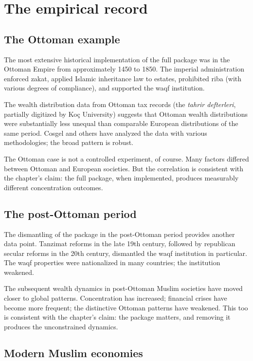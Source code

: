 \section{The empirical record}
\label{sec:perm-empirical}

\subsection{The Ottoman example}

The most extensive historical implementation of the full package
was in the Ottoman Empire from approximately 1450 to 1850. The
imperial administration enforced zakat, applied Islamic
inheritance law to estates, prohibited riba (with various degrees
of compliance), and supported the waqf institution.

The wealth distribution data from Ottoman tax records (the
\textit{tahrir defterleri}, partially digitized by Ko\c{c}
University) suggests that Ottoman wealth distributions were
substantially less unequal than comparable European
distributions of the same period. Cosgel and others have analyzed
the data with various methodologies; the broad pattern is robust.

The Ottoman case is not a controlled experiment, of course. Many
factors differed between Ottoman and European societies. But the
correlation is consistent with the chapter's claim: the full
package, when implemented, produces measurably different
concentration outcomes.

\subsection{The post-Ottoman period}

The dismantling of the package in the post-Ottoman period
provides another data point. Tanzimat reforms in the late 19th
century, followed by republican secular reforms in the 20th
century, dismantled the waqf institution in particular. The waqf
properties were nationalized in many countries; the institution
weakened.

The subsequent wealth dynamics in post-Ottoman Muslim societies
have moved closer to global patterns. Concentration has increased;
financial crises have become more frequent; the distinctive
Ottoman patterns have weakened. This too is consistent with the
chapter's claim: the package matters, and removing it produces
the unconstrained dynamics.

\subsection{Modern Muslim economies}

